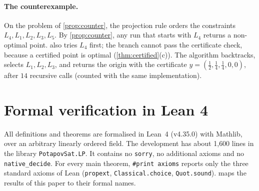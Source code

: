 \documentclass[11pt,a4paper]{article}
\theoremstyle{plain}
\theoremstyle{definition}
\theoremstyle{remark}
\newcommand{\lean}[1]{\texttt{\small #1}}
\begin{document}
\paragraph{The counterexample.} On the problem of \cref{prop:counter}, the projection rule
orders the constraints $L_4, L_1, L_2, L_3, L_5$. By \cref{prop:counter}, any run that starts
with $L_4$ returns a non-optimal point.  also tries $L_4$ first; the branch
cannot pass the certificate check, because a certified point is optimal
(\cref{thm:certified}(c)). The algorithm backtracks, selects $L_1, L_2, L_3$, and returns the
origin with the certificate $y=(\tfrac12,\tfrac14,\tfrac14,0,0)$, after $14$ recursive calls (counted with the same implementation).

\section{Formal verification in Lean 4}\label{sec:lean}

All definitions and theorems are formalised in Lean~4 (v4.35.0) with Mathlib, over an arbitrary
linearly ordered field. The development has about 1{,}600 lines in the library
\lean{PotapovSat.LP}. It contains no \lean{sorry}, no additional axioms and no
\lean{native\_decide}. For every main theorem, \lean{\#print axioms} reports only the three
standard axioms of Lean (\lean{propext}, \lean{Classical.choice}, \lean{Quot.sound}).
 maps the results of this paper to their formal names.
\end{document}
